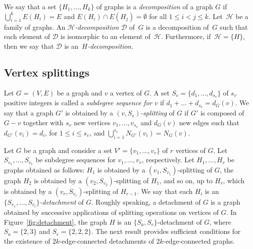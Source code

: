 \documentclass[12pt,reqno,a4paper]{amsart}
\newcommand{\D}{\mathcal{D}}
\begin{document}
We say that a set 
$\{H_1,\ldots,H_k\}$ of graphs is a
\emph{decomposition} of a graph $G$ if $\bigcup_{i=1}^k
E(H_i) = E$ and $E(H_i)\cap E(H_j)=\emptyset$ for all $1\leq i<j\leq
k$. Let~\(\mathcal{H}\) be a family of graphs. An
\emph{\(\mathcal{H}\)-decomposition} $\D$ of~\(G\) is a
decomposition of~\(G\) such that each element of $\D$ is
isomorphic to an element of~\(\mathcal{H}\). Furthermore, if~\(\mathcal{H} =
\{H\}\), then we say that $\D$ is an~\emph{\(H\)-decomposition}.



\subsection{Vertex splittings}
Let $G=(V,E)$ be a graph and $v$ a vertex of \(G\). 
A set $S_v=\{d_1,\ldots,d_{s_v}\}$ of $s_v$ positive integers is called a 
\emph{subdegree sequence for $v$} if
$d_1+\ldots+d_{s_v}=d_G(v)$. We say that a graph $G'$ is obtained 
by a \emph{$(v,S_v)$-splitting} 
of \(G\)
if $G'$ is composed of 
$G-v$ together with $s_v$ new vertices $v_1,\ldots,v_{s_v}$ and {$d_G(v)$ new edges} such that $d_{G'}(v_i)=d_i$, for $1\leq i\leq 
s_v$, and $\bigcup_{i=1}^{s_v} N_{G'}(v_i) = N_G(v)$.

Let $G$ be a graph and consider a set $V'=\{v_1,\ldots,v_r\}$ of $r$
vertices of $G$. Let $S_{v_1},\ldots,S_{v_r}$ be subdegree sequences
for $v_1,\ldots,v_r$, respectively. {Let $H_1,\ldots,H_r$ be graphs
  obtained as follows: $H_1$ is obtained by a
  $(v_1,S_{v_1})$-splitting of $G$, the graph $H_2$ is obtained by a
  $(v_2,S_{v_2})$-splitting of $H_1$, and so on, up to $H_r$, which is
  obtained by a $(v_r,S_{v_r})$-splitting of $H_{r-1}$.} We say that
each $H_i$ is an \emph{$\{S_{v_1},\ldots,S_{v_i}\}$-detachment} of
$G$. 
%
%	
Roughly speaking, a
detachment of $G$ is a graph obtained by successive
applications of splitting operations on vertices of $G$. In
Figure~\ref{fig:detachment}, the graph $H$ is an
$\{S_a,S_e\}$-detachment of $G$, where $S_a=\{2,3\}$ and
$S_e=\{2,2,2\}$. The next result provides sufficient conditions for the existence of
$2k$-edge-connected detachments of $2k$-edge-connected graphs.
\end{document}

